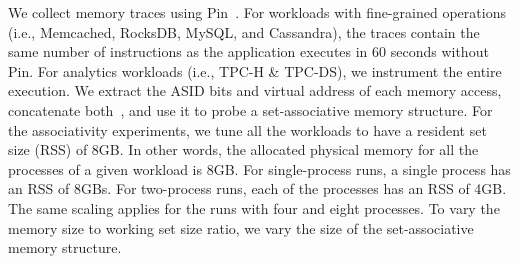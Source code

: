 


We collect memory traces using Pin~\cite{luk:pin}. For workloads with fine-grained operations (i.e., Memcached, RocksDB, MySQL, and Cassandra), the traces contain the same number of instructions as the application executes in 60 seconds without Pin. For analytics workloads (i.e., TPC-H \& TPC-DS), we instrument the entire execution. We extract the ASID bits and virtual address of each memory access, concatenate both~\cite{basu:reducing, yoon:revisiting},  and use it to probe a set-associative memory structure. For the associativity experiments, we tune all the workloads to have a resident set size (RSS) of 8GB. In other words, the allocated physical memory for all the processes of a given workload is 8GB. For single-process runs, a single process has an RSS of 8GBs. For two-process runs, each of the processes has an RSS of 4GB. The same scaling applies for the runs with four and eight processes. To vary the memory size to working set size ratio, we vary the size of the set-associative memory structure. 



